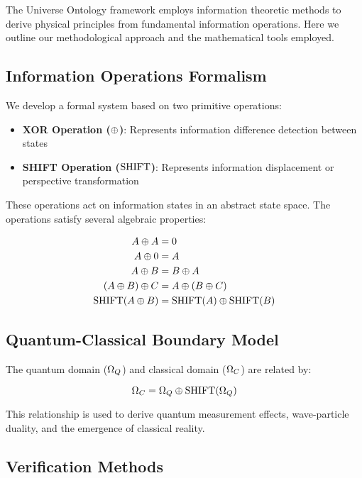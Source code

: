 The Universe Ontology framework employs information theoretic methods to derive physical principles from fundamental information operations. Here we outline our methodological approach and the mathematical tools employed.

\subsection{Information Operations Formalism}

We develop a formal system based on two primitive operations:

\begin{itemize}
    \item \textbf{XOR Operation ($\oplus$)}: Represents information difference detection between states
    \item \textbf{SHIFT Operation ($\text{SHIFT}$)}: Represents information displacement or perspective transformation
\end{itemize}

These operations act on information states in an abstract state space. The operations satisfy several algebraic properties:

\begin{align}
A \oplus A &= 0 \\
A \oplus 0 &= A \\
A \oplus B &= B \oplus A \\
(A \oplus B) \oplus C &= A \oplus (B \oplus C) \\
\text{SHIFT}(A \oplus B) &= \text{SHIFT}(A) \oplus \text{SHIFT}(B)
\end{align}

\subsection{Quantum-Classical Boundary Model}

The quantum domain ($\Omega_Q$) and classical domain ($\Omega_C$) are related by:

\begin{equation}
\Omega_C = \Omega_Q \oplus \text{SHIFT}(\Omega_Q)
\end{equation}

This relationship is used to derive quantum measurement effects, wave-particle duality, and the emergence of classical reality.

\subsection{Verification Methods}

